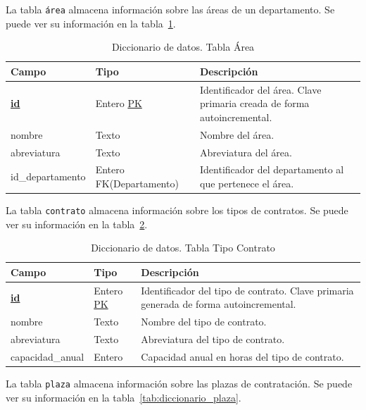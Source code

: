 La tabla \texttt{área} almacena información sobre las áreas de un departamento. 
Se puede ver su información en la tabla~\ref{tab:diccionario_area}.

\begin{table}
  \centering 
  \begin{tabular}{l p{} p{}}
    \toprule
    \textbf{Campo} & \textbf{Tipo} & \textbf{Descripción}\\
    \midrule
    \textbf{\underline{id}} & Entero \underline{PK} & Identificador del área. Clave primaria creada de forma autoincremental. \\ \addlinespace
    nombre & Texto & Nombre del área. \\ \addlinespace
    abreviatura & Texto & Abreviatura del área. \\ \addlinespace
    id\_departamento & Entero FK(Departamento) & Identificador del departamento al que pertenece el área. \\
    \bottomrule
  \end{tabular}
  \caption{Diccionario de datos. Tabla Área}
  \label{tab:diccionario_area}
\end{table}

La tabla \texttt{contrato} almacena información sobre los tipos de contratos. 
Se puede ver su información en la tabla~\ref{tab:diccionario_tipo_contrato}.

\begin{table}
  \centering 
  \begin{tabular}{l p{} p{}}
    \toprule
    \textbf{Campo} & \textbf{Tipo} & \textbf{Descripción}\\
    \midrule
    \textbf{\underline{id}} & Entero \underline{PK} & Identificador del tipo de contrato. Clave primaria generada de forma autoincremental. \\ \addlinespace
    nombre & Texto & Nombre del tipo de contrato. \\ \addlinespace
    abreviatura & Texto & Abreviatura del tipo de contrato. \\ \addlinespace
    capacidad\_anual & Entero & Capacidad anual en horas del tipo de contrato. \\
    \bottomrule
  \end{tabular}
  \caption{Diccionario de datos. Tabla Tipo Contrato}
  \label{tab:diccionario_tipo_contrato}
\end{table}

La tabla \texttt{plaza} almacena información sobre las plazas de contratación. 
Se puede ver su información en la tabla~\ref{tab:diccionario_plaza}.

